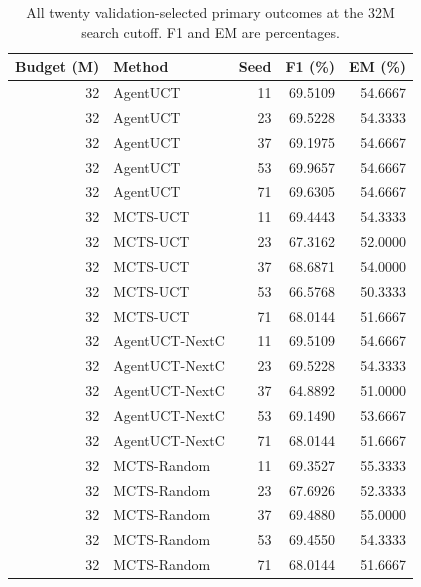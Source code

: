 \begin{table}[t]
\centering\small
\setlength{\tabcolsep}{4pt}
\caption{All twenty validation-selected primary outcomes at the 32M search cutoff. F1 and EM are percentages.}
\label{tab:seed-values-b32000000}
\begin{tabular}{rlrrr}
\toprule
Budget (M) & Method & Seed & F1 (\%) & EM (\%) \\
\midrule
32 & AgentUCT & 11 & 69.5109 & 54.6667 \\
32 & AgentUCT & 23 & 69.5228 & 54.3333 \\
32 & AgentUCT & 37 & 69.1975 & 54.6667 \\
32 & AgentUCT & 53 & 69.9657 & 54.6667 \\
32 & AgentUCT & 71 & 69.6305 & 54.6667 \\
32 & MCTS-UCT & 11 & 69.4443 & 54.3333 \\
32 & MCTS-UCT & 23 & 67.3162 & 52.0000 \\
32 & MCTS-UCT & 37 & 68.6871 & 54.0000 \\
32 & MCTS-UCT & 53 & 66.5768 & 50.3333 \\
32 & MCTS-UCT & 71 & 68.0144 & 51.6667 \\
32 & AgentUCT-NextC & 11 & 69.5109 & 54.6667 \\
32 & AgentUCT-NextC & 23 & 69.5228 & 54.3333 \\
32 & AgentUCT-NextC & 37 & 64.8892 & 51.0000 \\
32 & AgentUCT-NextC & 53 & 69.1490 & 53.6667 \\
32 & AgentUCT-NextC & 71 & 68.0144 & 51.6667 \\
32 & MCTS-Random & 11 & 69.3527 & 55.3333 \\
32 & MCTS-Random & 23 & 67.6926 & 52.3333 \\
32 & MCTS-Random & 37 & 69.4880 & 55.0000 \\
32 & MCTS-Random & 53 & 69.4550 & 54.3333 \\
32 & MCTS-Random & 71 & 68.0144 & 51.6667 \\
\bottomrule
\end{tabular}
\end{table}

